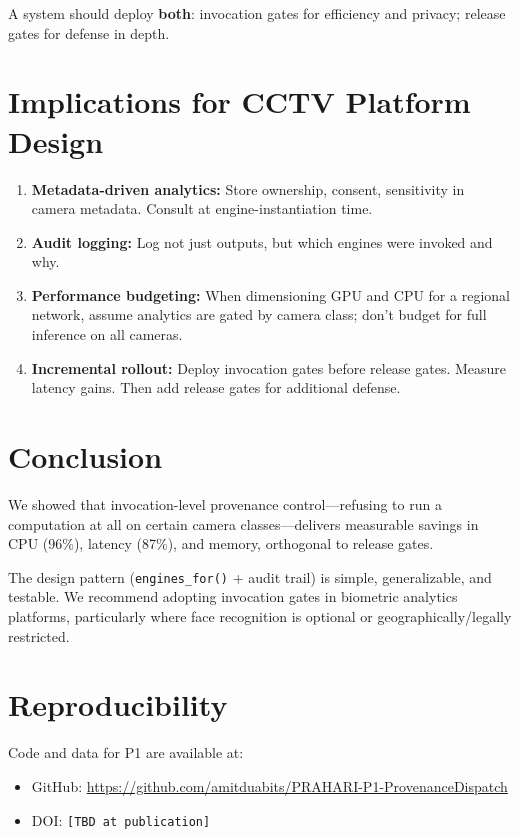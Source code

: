 \documentclass[sigplan,review]{acmart}
\begin{document}
A system should deploy \textbf{both}: invocation gates for efficiency and privacy; release gates for defense in depth.

\section{Implications for CCTV Platform Design}

\begin{enumerate}
  \item \textbf{Metadata-driven analytics:} Store ownership, consent, sensitivity in camera metadata.
    Consult at engine-instantiation time.
  \item \textbf{Audit logging:} Log not just outputs, but which engines were invoked and why.
  \item \textbf{Performance budgeting:} When dimensioning GPU and CPU for a regional network, assume
    analytics are gated by camera class; don't budget for full inference on all cameras.
  \item \textbf{Incremental rollout:} Deploy invocation gates before release gates. Measure latency gains.
    Then add release gates for additional defense.
\end{enumerate}

\section{Conclusion}

We showed that invocation-level provenance control—refusing to run a computation at all on certain
camera classes—delivers measurable savings in CPU (96\%), latency (87\%), and memory, orthogonal to
release gates.

The design pattern (\texttt{engines\_for()} + audit trail) is simple, generalizable, and testable.
We recommend adopting invocation gates in biometric analytics platforms, particularly where
face recognition is optional or geographically/legally restricted.

\appendix

\section{Reproducibility}

Code and data for P1 are available at:
\begin{itemize}
  \item GitHub: \url{https://github.com/amitduabits/PRAHARI-P1-ProvenanceDispatch}
  \item DOI: \texttt{[TBD at publication]}
\end{itemize}
\end{document}
